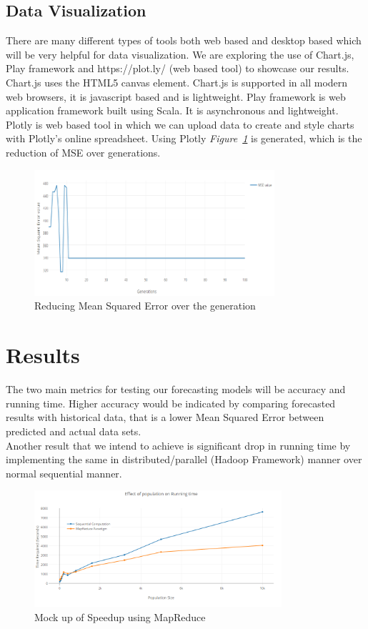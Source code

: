 \documentclass[12pt,journal,compsoc]{IEEEtran}
\begin{document}
\subsection{Data Visualization}

There are many different types of tools both web based and desktop based which will be very helpful for data visualization. We are exploring the use of Chart.js, Play framework and https://plot.ly/ (web based tool) to showcase our results.
 \\\indent Chart.js uses the HTML5 canvas element. Chart.js is supported in all modern web browsers, it is javascript based and is lightweight. Play framework is web application framework built using Scala. It is asynchronous and lightweight.
 \\\indent Plotly is web based tool in which we can upload data to create and style charts with Plotly's online spreadsheet. Using  Plotly \emph{Figure~\ref{datav}} is generated, which is the reduction of MSE over generations.

\begin{figure}
\includegraphics[width=3.5in]{datav}
\caption{Reducing Mean Squared Error over the generation}
\label{datav}
\end{figure}

\section{Results	}
The two main metrics for testing our forecasting models will be accuracy and running time. Higher accuracy would be indicated by comparing forecasted results with historical data, that is a lower Mean Squared Error between predicted and actual data sets. \\\indent Another result that we intend to achieve is significant drop in running time by implementing the same in distributed/parallel (Hadoop Framework) manner over normal sequential manner. 
\begin{figure}
\includegraphics[width=3.6in]{speedup}
\caption{Mock up of Speedup using MapReduce}
\end{figure}
\end{document}
